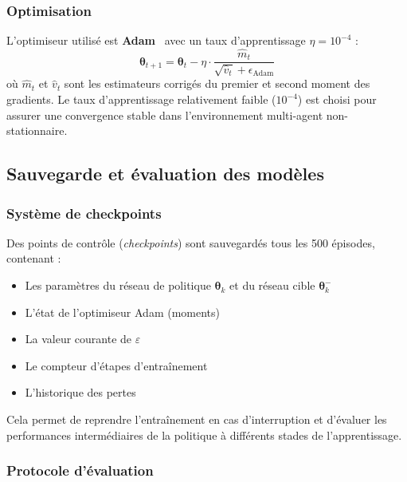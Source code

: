 \documentclass[conference]{IEEEtran}
\begin{document}
\subsubsection{Optimisation}

L'optimiseur utilisé est \textbf{Adam}~\cite{kingma2015} avec un taux d'apprentissage $\eta = 10^{-4}$ :
\begin{equation}
    \boldsymbol{\theta}_{t+1} = \boldsymbol{\theta}_t - \eta \cdot \frac{\hat{m}_t}{\sqrt{\hat{v}_t} + \epsilon_{\text{Adam}}}
    \label{eq:adam}
\end{equation}
où $\hat{m}_t$ et $\hat{v}_t$ sont les estimateurs corrigés du premier et second moment des gradients. Le taux d'apprentissage relativement faible ($10^{-4}$) est choisi pour assurer une convergence stable dans l'environnement multi-agent non-stationnaire.

\subsection{Sauvegarde et évaluation des modèles}
\label{sec:checkpoints}

\subsubsection{Système de checkpoints}

Des points de contrôle (\textit{checkpoints}) sont sauvegardés tous les 500 épisodes, contenant :
\begin{itemize}
    \item Les paramètres du réseau de politique $\boldsymbol{\theta}_k$ et du réseau cible $\boldsymbol{\theta}_k^{-}$
    \item L'état de l'optimiseur Adam (moments)
    \item La valeur courante de $\varepsilon$
    \item Le compteur d'étapes d'entraînement
    \item L'historique des pertes
\end{itemize}

Cela permet de reprendre l'entraînement en cas d'interruption et d'évaluer les performances intermédiaires de la politique à différents stades de l'apprentissage.

\subsubsection{Protocole d'évaluation}
\end{document}
